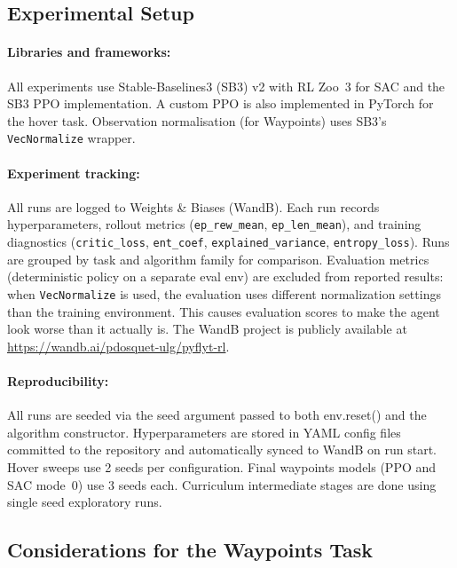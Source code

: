 \documentclass[11pt,a4paper]{article}
\begin{document}
\subsection{Experimental Setup}

\paragraph{Libraries and frameworks:}
All experiments use Stable-Baselines3 (SB3) v2 with RL Zoo~3 for SAC and the SB3 PPO implementation. A custom PPO is also implemented in PyTorch for the hover task. Observation normalisation (for Waypoints) uses SB3's \texttt{VecNormalize} wrapper.

\paragraph{Experiment tracking:}
All runs are logged to Weights \& Biases (WandB). Each run records hyperparameters, rollout metrics (\texttt{ep\_rew\_mean}, \texttt{ep\_len\_mean}), and training diagnostics (\texttt{critic\_loss}, \texttt{ent\_coef}, \texttt{explained\_variance}, \texttt{entropy\_loss}). Runs are grouped by task and algorithm family for comparison. Evaluation metrics (deterministic policy on a separate eval env) are excluded from reported results: when \texttt{VecNormalize} is used, the evaluation uses different normalization settings than the training environment. This causes evaluation scores to make the agent look worse than it actually is. The WandB project is publicly available at \url{https://wandb.ai/pdosquet-ulg/pyflyt-rl}.

\paragraph{Reproducibility:}
All runs are seeded via the seed argument passed to both env.reset() and the algorithm constructor. Hyperparameters are stored in YAML config files committed to the repository and automatically synced to WandB on run start. Hover sweeps use 2 seeds per configuration. Final waypoints models (PPO and SAC mode~0) use 3 seeds each. Curriculum intermediate stages are done using single seed exploratory runs.

\subsection{Considerations for the Waypoints Task}
\end{document}
